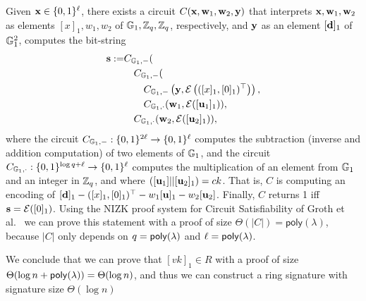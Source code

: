 Given \(\mathbf{x}\in\{0,1\}^\ell\), there exists a circuit \(C(\mathbf{x},\mathbf{w}_1,\mathbf{w}_2,\mathbf{y})\) that interprets \(\mathbf{x},\mathbf{w}_1,\mathbf{w}_2\) as  elements \([x]_1,w_1,w_2\) of \(\mathbb{G}_1,\mathbb{Z}_q,\mathbb{Z}_q\), respectively, and \(\mathbf{y}\) as an element \([\mathbf{d}]_1\) of \(\mathbb{G}_1^2\), computes the bit-string
\begin{align*}
\mathbf{s}:=
    &C_{\mathbb{G}_1,-}(\\
        &\quad C_{\mathbb{G}_1,-}(\\
            &\qquad C_{\mathbb{G}_1,-}\left(
                \mathbf{y},
                \mathcal{E}\left(
                        ({[x]_1},{[0]_1})^\top\right)\right),\\
            &\qquad C_{\mathbb{G}_1,\cdot}(
                        \mathbf{w}_1,
                        \mathcal{E}([\mathbf{u}_1]_1)),\\
        &\quad C_{\mathbb{G}_1,\cdot}(
                    \mathbf{w}_2,
                    \mathcal{E}([\mathbf{u}_2]_1)),
\end{align*}
where the circuit $C_{\mathbb{G}_1,-}:\{0,1\}^{2\ell}\to\{0,1\}^\ell$ computes the subtraction (inverse and addition computation) of two elements of $\mathbb{G}_1$, and the circuit $C_{\mathbb{G}_1,\cdot}:\{0,1\}^{\log q+\ell}\to\{0,1\}^\ell$ computes the multiplication of an element from $\mathbb{G}_1$ and an integer in $\mathbb{Z}_q$, and where \(([\mathbf{u}_1]||[\mathbf{u}_2]_1)=ck\). That is, $C$ is computing an encoding of $[\mathbf{d}]_1-([x]_1,[0]_1)^\top-w_1[\mathbf{u}]_1-w_2[\mathbf{u}_2]$. Finally, $C$ returns 1 iff \(\mathbf{s}=\mathcal{E}([0]_1)\). Using the NIZK proof system for Circuit Satisfiability of Groth et al.~\cite{EC:GroOstSah06} we can prove this statement with a proof of size \(\Theta(|C|)=\mathsf{poly}(\lambda)\), because \(|C|\) only depends on \(q=\mathsf{poly}(\lambda)\) and \(\ell=\mathsf{poly}(\lambda)\).

We conclude that we can prove that \([vk]_1\in R\) with a proof of size \(\Theta(\log n +\mathsf{poly}(\lambda))=\Theta(\log n)\), and thus we can construct a ring signature with signature size \(\Theta(\log n)\)
